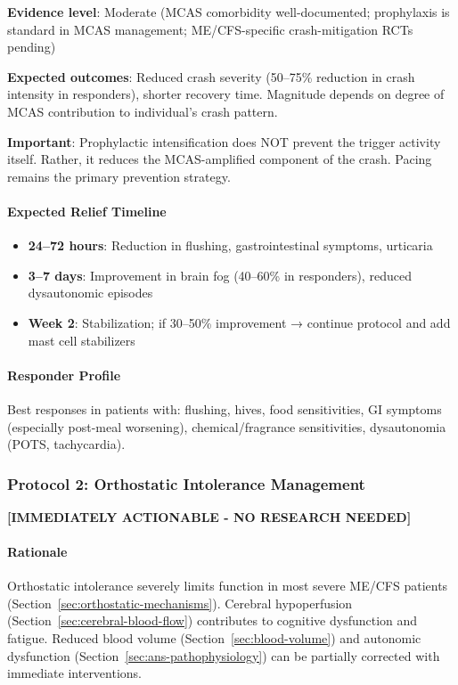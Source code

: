 \begin{recommendation}
\textbf{Evidence level}: Moderate (MCAS comorbidity well-documented; prophylaxis is standard in MCAS management; ME/CFS-specific crash-mitigation RCTs pending)

\textbf{Expected outcomes}: Reduced crash severity (50--75\% reduction in crash intensity in responders), shorter recovery time. Magnitude depends on degree of MCAS contribution to individual's crash pattern.

\textbf{Important}: Prophylactic intensification does NOT prevent the trigger activity itself. Rather, it reduces the MCAS-amplified component of the crash. Pacing remains the primary prevention strategy.

\end{recommendation}

\paragraph{Expected Relief Timeline}
\begin{itemize}
    \item \textbf{24--72 hours}: Reduction in flushing, gastrointestinal symptoms, urticaria
    \item \textbf{3--7 days}: Improvement in brain fog (40--60\% in responders), reduced dysautonomic episodes
    \item \textbf{Week 2}: Stabilization; if 30--50\% improvement → continue protocol and add mast cell stabilizers
\end{itemize}

\paragraph{Responder Profile}
Best responses in patients with: flushing, hives, food sensitivities, GI symptoms (especially post-meal worsening), chemical/fragrance sensitivities, dysautonomia (POTS, tachycardia).

\subsubsection{Protocol 2: Orthostatic Intolerance Management}

\textbf{[IMMEDIATELY ACTIONABLE - NO RESEARCH NEEDED]}

\paragraph{Rationale}
Orthostatic intolerance severely limits function in most severe ME/CFS patients (Section~\ref{sec:orthostatic-mechanisms}). Cerebral hypoperfusion (Section~\ref{sec:cerebral-blood-flow}) contributes to cognitive dysfunction and fatigue. Reduced blood volume (Section~\ref{sec:blood-volume}) and autonomic dysfunction (Section~\ref{sec:ans-pathophysiology}) can be partially corrected with immediate interventions.

